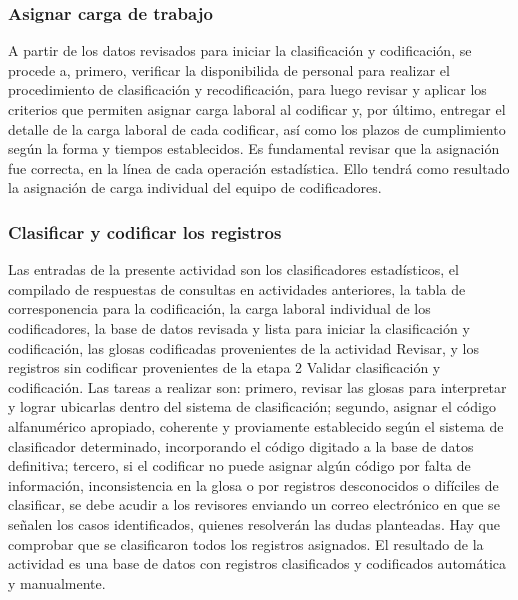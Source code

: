\documentclass[
]{article}
\begin{document}
\hypertarget{asignar-carga-de-trabajo}{%
\subsubsection{Asignar carga de trabajo}\label{asignar-carga-de-trabajo}}

A partir de los datos revisados para iniciar la clasificación y codificación, se procede a, primero, verificar la disponibilida de personal para realizar el procedimiento de clasificación y recodificación, para luego revisar y aplicar los criterios que permiten asignar carga laboral al codificar y, por último, entregar el detalle de la carga laboral de cada codificar, así como los plazos de cumplimiento según la forma y tiempos establecidos. Es fundamental revisar que la asignación fue correcta, en la línea de cada operación estadística. Ello tendrá como resultado la asignación de carga individual del equipo de codificadores.

\hypertarget{clasificar-y-codificar-los-registros}{%
\subsubsection{Clasificar y codificar los registros}\label{clasificar-y-codificar-los-registros}}

Las entradas de la presente actividad son los clasificadores estadísticos, el compilado de respuestas de consultas en actividades anteriores, la tabla de corresponencia para la codificación, la carga laboral individual de los codificadores, la base de datos revisada y lista para iniciar la clasificación y codificación, las glosas codificadas provenientes de la actividad Revisar, y los registros sin codificar provenientes de la etapa 2 Validar clasificación y codificación. Las tareas a realizar son: primero, revisar las glosas para interpretar y lograr ubicarlas dentro del sistema de clasificación; segundo, asignar el código alfanumérico apropiado, coherente y proviamente establecido según el sistema de clasificador determinado, incorporando el código digitado a la base de datos definitiva; tercero, si el codificar no puede asignar algún código por falta de información, inconsistencia en la glosa o por registros desconocidos o difíciles de clasificar, se debe acudir a los revisores enviando un correo electrónico en que se señalen los casos identificados, quienes resolverán las dudas planteadas. Hay que comprobar que se clasificaron todos los registros asignados. El resultado de la actividad es una base de datos con registros clasificados y codificados automática y manualmente.
\end{document}
